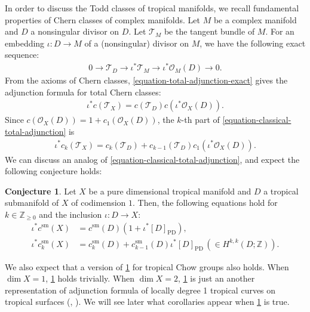 \documentclass[a4paper,dvipdfmx,reqno,12pt]{amsart}
\theoremstyle{definition}
\newtheorem{conjecture}[theorem]{Conjecture}
\newcommand{\PD}[1]{[#1]_{\mathrm{PD}}}
\numberwithin{equation}{section}
\begin{document}
In order to discuss the Todd classes of
tropical manifolds, we recall fundamental properties
of Chern classes of complex manifolds.
Let $M$ be a complex manifold and 
$D$ a nonsingular
divisor on $D$. Let $\mathcal{T}_M$ be the tangent
bundle of $M$.
For an embedding $\iota\colon D\to M$ of
a (nonsingular) divisor on $M$, we have the following
exact sequence: 
\begin{align}
\label{equation-total-adjunction-exact}
0 \to \mathcal{T}_{D}\to \iota^{*}\mathcal{T}_M
\to \iota^{*}\mathcal{O}_M(D)\to 0.
\end{align}
From the axioms of Chern classes,
\eqref{equation-total-adjunction-exact} gives 
the adjunction formula for total Chern classes:
\begin{align}
\label{equation-classical-total-adjunction}
\iota^{*}c(\mathcal{T}_X)
=c(\mathcal{T}_{D})c(\iota^{*}\mathcal{O}_X(D)).
\end{align}
Since $c(\mathcal{O}_X(D))=1+c_1(\mathcal{O}_X(D))$, 
the $k$-th part of \eqref{equation-classical-total-adjunction}
is
\begin{align}
\label{equation-classical-total-adjunction-2}
\iota^{*}c_k(\mathcal{T}_X)
=c_{k}(\mathcal{T}_{D})+
c_{k-1}(\mathcal{T}_{D})c_1(\iota^{*}\mathcal{O}_X(D)).
\end{align}
We can discuss an analog of 
\eqref{equation-classical-total-adjunction},
and expect the following conjecture holds:
\begin{conjecture}
\label{conjecture-grr-divisor}
Let $X$ be a pure dimensional tropical manifold
and $D$ a tropical submanifold of $X$ of codimension $1$.
Then, the following equations hold for 
$k\in \mathbb{Z}_{\geq 0}$ and the inclusion 
$\iota\colon D \to X$:
\begin{align}
\label{equation-total-adjunction}
\iota^{*}c^{\mathrm{sm}}(X)&=c^{\mathrm{sm}}(D)
(1+\iota^{*}\PD{D}), \\ 
\iota^{*}c^{\mathrm{sm}}_k(X)&=c^{\mathrm{sm}}_k(D)+
c^{\mathrm{sm}}_{k-1}(D)\iota^{*}\PD{D} \,
(\in H^{k,k}(D;\mathbb{Z})).
\end{align}
\end{conjecture}
We also expect that a version
of \cref{conjecture-grr-divisor} for tropical
Chow groups \cite[Definition 3.30]{shaw2015tropical}
also holds.
When $\dim X=1$, \cref{conjecture-grr-divisor} holds
trivially. When $\dim X=2$,
\cref{conjecture-grr-divisor}
is just an another representation of adjunction formula
of locally degree 1 tropical curves on tropical surfaces
(\cite[Theorem 6]{shaw2015tropical},
\cite[Theorem 5.2]{demedrano2023chern}).
We will see later what 
corollaries appear
when \cref{conjecture-grr-divisor} is true.  
\end{document}
